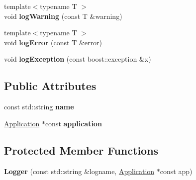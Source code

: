 \begin{DoxyCompactItemize}
\item 
\hypertarget{classcore_1_1_logger_a162da52ca575a87316086f4ac5a0808e}{{\footnotesize template$<$typename T $>$ }\\void {\bfseries log\-Warning} (const T \&warning)}\label{classcore_1_1_logger_a162da52ca575a87316086f4ac5a0808e}

\item 
\hypertarget{classcore_1_1_logger_a5fa4f4fd3ab353ae37b3b68e744f2332}{{\footnotesize template$<$typename T $>$ }\\void {\bfseries log\-Error} (const T \&error)}\label{classcore_1_1_logger_a5fa4f4fd3ab353ae37b3b68e744f2332}

\item 
\hypertarget{classcore_1_1_logger_a29acd4c78975d23aba26f08d4115a1c9}{void {\bfseries log\-Exception} (const boost\-::exception \&x)}\label{classcore_1_1_logger_a29acd4c78975d23aba26f08d4115a1c9}

\end{DoxyCompactItemize}
\subsection*{Public Attributes}
\begin{DoxyCompactItemize}
\item 
\hypertarget{classcore_1_1_logger_ab266f3ae30812ef5d783673849e45c56}{const std\-::string {\bfseries name}}\label{classcore_1_1_logger_ab266f3ae30812ef5d783673849e45c56}

\item 
\hypertarget{classcore_1_1_logger_ab1f665a34d2c5f6620e4a4c6dd5930b8}{\hyperlink{classcore_1_1_application}{Application} $\ast$const {\bfseries application}}\label{classcore_1_1_logger_ab1f665a34d2c5f6620e4a4c6dd5930b8}

\end{DoxyCompactItemize}
\subsection*{Protected Member Functions}
\begin{DoxyCompactItemize}
\item 
\hypertarget{classcore_1_1_logger_a619a3e4a41efaf7312ce98b72b50da2b}{{\bfseries Logger} (const std\-::string \&logname, \hyperlink{classcore_1_1_application}{Application} $\ast$const app)}\label{classcore_1_1_logger_a619a3e4a41efaf7312ce98b72b50da2b}

\end{DoxyCompactItemize}
